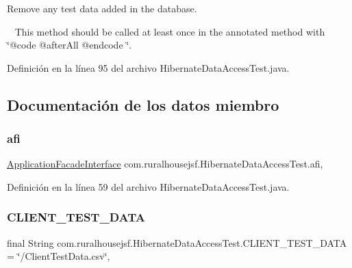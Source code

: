 Remove any test data added in the database. 

~\newline
 This method should be called at least once in the annotated method with \char`\"{}@code @after\+All @endcode \char`\"{}. 

Definición en la línea 95 del archivo Hibernate\+Data\+Access\+Test.\+java.



\subsection{Documentación de los datos miembro}
\mbox{\label{a00272_a80a8ded7f2e12687541427d97fdbe29a}} 
\subsubsection{\texorpdfstring{afi}{afi}}
{\footnotesize\ttfamily \mbox{\hyperlink{a00136}{Application\+Facade\+Interface}} com.\+ruralhousejsf.\+Hibernate\+Data\+Access\+Test.\+afi\hspace{0.3cm}{\ttfamily [static]}, {\ttfamily [package]}}



Definición en la línea 59 del archivo Hibernate\+Data\+Access\+Test.\+java.

\mbox{\label{a00272_ae42994f5a5d8bf916a38b64cda2788b1}} 
\subsubsection{\texorpdfstring{CLIENT\_TEST\_DATA}{CLIENT\_TEST\_DATA}}
{\footnotesize\ttfamily final String com.\+ruralhousejsf.\+Hibernate\+Data\+Access\+Test.\+C\+L\+I\+E\+N\+T\+\_\+\+T\+E\+S\+T\+\_\+\+D\+A\+TA = \char`\"{}/Client\+Test\+Data.\+csv\char`\"{}\hspace{0.3cm}{\ttfamily [static]}, {\ttfamily [package]}}



